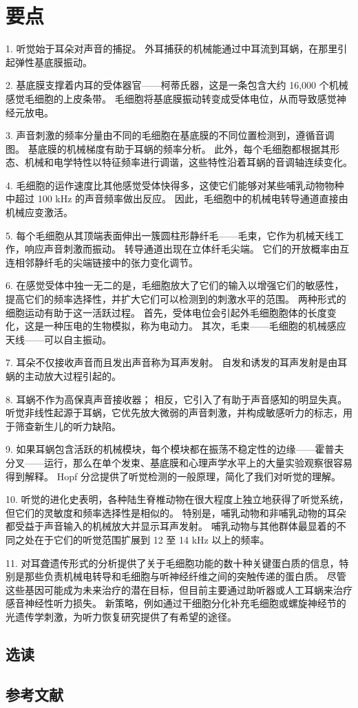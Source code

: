 \section{要点}
1. 听觉始于耳朵对声音的捕捉。 外耳捕获的机械能通过中耳流到耳蜗，在那里引起弹性基底膜振动。 

2. 基底膜支撑着内耳的受体器官——柯蒂氏器，这是一条包含大约 16,000 个机械感觉毛细胞的上皮条带。 毛细胞将基底膜振动转变成受体电位，从而导致感觉神经元放电。 

3. 声音刺激的频率分量由不同的毛细胞在基底膜的不同位置检测到，遵循音调图。 基底膜的机械梯度有助于耳蜗的频率分析。 此外，每个毛细胞都根据其形态、机械和电学特性以特征频率进行调谐，这些特性沿着耳蜗的音调轴连续变化。 

4. 毛细胞的运作速度比其他感觉受体快得多，这使它们能够对某些哺乳动物物种中超过 100 kHz 的声音频率做出反应。 因此，毛细胞中的机械电转导通道直接由机械应变激活。 

5. 每个毛细胞从其顶端表面伸出一簇圆柱形静纤毛——毛束，它作为机械天线工作，响应声音刺激而振动。 转导通道出现在立体纤毛尖端。 它们的开放概率由互连相邻静纤毛的尖端链接中的张力变化调节。 

6. 在感觉受体中独一无二的是，毛细胞放大了它们的输入以增强它们的敏感性，提高它们的频率选择性，并扩大它们可以检测到的刺激水平的范围。 两种形式的细胞运动有助于这一活跃过程。 首先，受体电位会引起外毛细胞胞体的长度变化，这是一种压电的生物模拟，称为电动力。 其次，毛束——毛细胞的机械感应天线——可以自主振动。 

7. 耳朵不仅接收声音而且发出声音称为耳声发射。 自发和诱发的耳声发射是由耳蜗的主动放大过程引起的。 

8. 耳蜗不作为高保真声音接收器； 相反，它引入了有助于声音感知的明显失真。 听觉非线性起源于耳蜗，它优先放大微弱的声音刺激，并构成敏感听力的标志，用于筛查新生儿的听力缺陷。 

9. 如果耳蜗包含活跃的机械模块，每个模块都在振荡不稳定性的边缘——霍普夫分叉——运行，那么在单个发束、基底膜和心理声学水平上的大量实验观察很容易得到解释。 Hopf 分岔提供了听觉检测的一般原理，简化了我们对听觉的理解。 

10. 听觉的进化史表明，各种陆生脊椎动物在很大程度上独立地获得了听觉系统，但它们的灵敏度和频率选择性是相似的。 特别是，哺乳动物和非哺乳动物的耳朵都受益于声音输入的机械放大并显示耳声发射。 哺乳动物与其他群体最显着的不同之处在于它们的听觉范围扩展到 12 至 14 kHz 以上的频率。 

11. 对耳聋遗传形式的分析提供了关于毛细胞功能的数十种关键蛋白质的信息，特别是那些负责机械电转导和毛细胞与听神经纤维之间的突触传递的蛋白质。 尽管这些基因可能成为未来治疗的潜在目标，但目前主要通过助听器或人工耳蜗来治疗感音神经性听力损失。 新策略，例如通过干细胞分化补充毛细胞或螺旋神经节的光遗传学刺激，为听力恢复研究提供了有希望的途径。

\subsection{选读}
\subsection{参考文献}